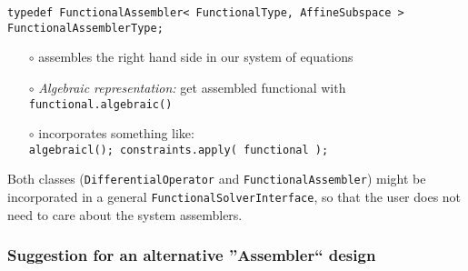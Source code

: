 \documentclass[a4paper,11pt]{article}
\numberwithin{equation}{section}
\newcommand{\CodeT}[1]{\textnormal{\texttt{#1}}}
\begin{document}
\noindent\CodeT{typedef FunctionalAssembler< FunctionalType, AffineSubspace >}\\
\CodeT{FunctionalAssemblerType;}
\begin{itemize}
	\item[$\circ$] assembles the right hand side in our system of equations 
  \item[$\circ$] {\it Algebraic representation:} get assembled functional with \CodeT{functional.algebraic()}
  \item[$\circ$] incorporates something like:\\
\CodeT{algebraicl(); constraints.apply( functional );} 
\end{itemize}

Both classes (\CodeT{DifferentialOperator} and \CodeT{FunctionalAssembler}) might be incorporated in a general \CodeT{FunctionalSolverInterface}, so that the user does not need to care about the system assemblers.




\subsubsection{Suggestion for an alternative ''Assembler`` design}
\end{document}
